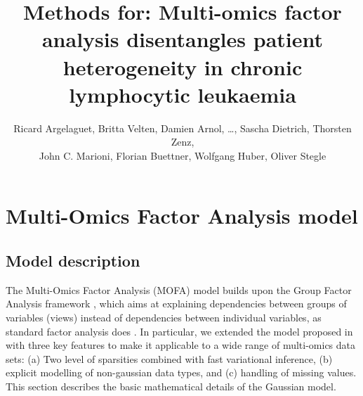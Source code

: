 \documentclass[10pt, a4paper,openany]{report}
\title{Methods for: Multi-omics factor analysis disentangles patient heterogeneity in chronic lymphocytic leukaemia}
\author{Ricard Argelaguet, Britta Velten, Damien Arnol, …, Sascha Dietrich, Thorsten Zenz, \\ John C. Marioni, Florian Buettner, Wolfgang Huber, Oliver Stegle}
\begin{document}
	
\maketitle
\tableofcontents



\section{Multi-Omics Factor Analysis model}

\subsection{Model description}
The Multi-Omics Factor Analysis (MOFA) model builds upon the Group Factor Analysis framework \cite{virtanen2012bayesian,klami2015group,bunte2016sparse,zhao2016bayesian}, which aims at explaining dependencies between groups of variables (views) instead of dependencies between individual variables, as standard factor analysis does \cite{basilevsky2009statistical}. In particular, we extended the model proposed in \cite{virtanen2012bayesian} with three key features to make it applicable to a wide range of multi-omics data sets: (a) Two level of sparsities combined with fast variational inference, (b) explicit modelling of non-gaussian data types, and (c) handling of missing values.\\
This section describes the basic mathematical details of the Gaussian model.\\
\end{document}
